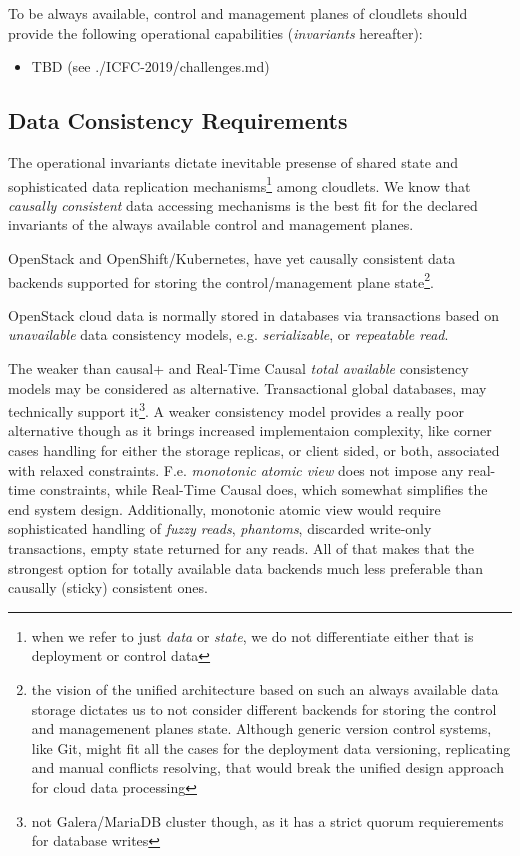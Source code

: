 \documentclass[conference]{IEEEtran}
\begin{document}
To be always available, control and management planes of cloudlets should
provide the following operational capabilities (\textit{invariants} hereafter):

\begin{itemize}
  \item TBD (see ./ICFC-2019/challenges.md)
\end{itemize}

\subsection{Data Consistency Requirements}

The operational invariants dictate inevitable presense of shared state and
sophisticated data replication mechanisms\footnote{when we refer to just
\textit{data} or \textit{state}, we do not differentiate either that is
deployment or control data} among cloudlets. We know\cite{b4} that
\textit{causally consistent}\cite{b1}\cite{b2} data accessing mechanisms is
the best fit for the declared invariants of the always available control and
management planes.

OpenStack and OpenShift/Kubernetes, have yet causally consistent data backends
supported for storing the control/management plane state\footnote{the vision
of the unified architecture based on such an always available data storage
dictates us to not consider different backends for storing the control and
managemenent planes state. Although generic version control systems, like Git,
might fit all the cases for the deployment data versioning, replicating and
manual conflicts resolving, that would break the unified design approach for
cloud data processing}.

OpenStack cloud data is normally stored in databases via transactions based on
\textit{unavailable}\cite{b4} data consistency models, e.g.
\textit{serializable}\cite{b4}, or \textit{repeatable read}\cite{b4}.

The weaker than causal+ and Real-Time Causal \textit{total available}\cite{b4}
consistency models may be considered as alternative. Transactional global
databases\cite{b5}, may technically support it\footnote{not Galera/MariaDB
cluster though, as it has a strict quorum requierements for database writes}. A
weaker consistency model provides a really poor alternative though as it brings
increased implementaion complexity, like corner cases handling for either the
storage replicas, or client sided, or both, associated with relaxed
constraints. F.e. \textit{monotonic atomic view}\cite{b4} does not impose any
real-time constraints, while Real-Time Causal does, which somewhat simplifies
the end system design. Additionally, monotonic atomic view would require
sophisticated handling of \textit{fuzzy reads}\cite{b4},
\textit{phantoms}\cite{b4}, discarded write-only transactions, empty state
returned for any reads. All of that makes that the strongest option for totally
available data backends much less preferable than causally (sticky) consistent
ones.
\end{document}
